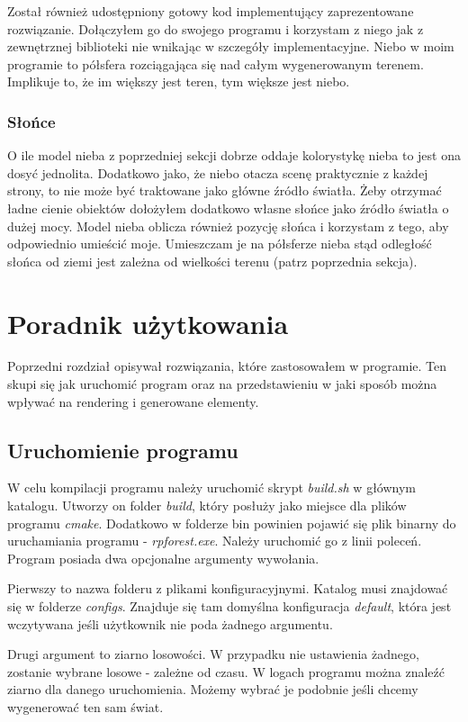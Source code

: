 \documentclass[inz,longabstract]{iithesis}
\begin{document}
            Został również udostępniony gotowy kod implementujący zaprezentowane rozwiązanie. Dołączyłem go do swojego programu i korzystam z niego jak z zewnętrznej biblioteki nie wnikając w szczegóły implementacyjne. Niebo w moim programie to półsfera rozciągająca się nad całym wygenerowanym terenem. Implikuje to, że im większy jest teren, tym większe jest niebo.
        
        \subsection{Słońce}
            O ile model nieba z poprzedniej sekcji dobrze oddaje kolorystykę nieba to jest ona dosyć jednolita. Dodatkowo jako, że niebo otacza scenę praktycznie z każdej strony, to nie może być traktowane jako główne źródło światła. Żeby otrzymać ładne cienie obiektów dołożyłem dodatkowo własne słońce jako źródło światła o dużej mocy. Model nieba oblicza również pozycję słońca i korzystam z tego, aby odpowiednio umieścić moje. Umieszczam je na półsferze nieba stąd odległość słońca od ziemi jest zależna od wielkości terenu (patrz poprzednia sekcja).
            
\chapter{Poradnik użytkowania}
    Poprzedni rozdział opisywał rozwiązania, które zastosowałem w programie. Ten skupi się jak uruchomić program oraz na przedstawieniu w jaki sposób można wpływać na rendering i generowane elementy.
    
    \section{Uruchomienie programu}
        W celu kompilacji programu należy uruchomić skrypt \textit{build.sh} w głównym katalogu. Utworzy on folder \textit{build}, który posłuży jako miejsce dla plików programu \textit{cmake}. Dodatkowo w folderze bin powinien pojawić się plik binarny do uruchamiania programu - \textit{rpforest.exe}. Należy uruchomić go z linii poleceń. Program posiada dwa opcjonalne argumenty wywołania. 
        
        Pierwszy to nazwa folderu z plikami konfiguracyjnymi. Katalog musi znajdować się w folderze \textit{configs}. Znajduje się tam domyślna konfiguracja \textit{default}, która jest wczytywana jeśli użytkownik nie poda żadnego argumentu. 
        
        Drugi argument to ziarno losowości. W przypadku nie ustawienia żadnego, zostanie wybrane losowe - zależne od czasu. W logach programu można znaleźć ziarno dla danego uruchomienia. Możemy wybrać je podobnie jeśli chcemy wygenerować ten sam świat. 
    
\end{document}
